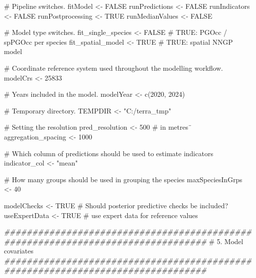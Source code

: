 \documentclass[
  letterpaper,
  DIV=11,
  numbers=noendperiod]{scrartcl}
\newenvironment{Shaded}{\begin{snugshade}}{\end{snugshade}}
\newcommand{\CommentTok}[1]{\textcolor[rgb]{0.37,0.37,0.37}{#1}}
\newcommand{\ConstantTok}[1]{\textcolor[rgb]{0.56,0.35,0.01}{#1}}
\newcommand{\DecValTok}[1]{\textcolor[rgb]{0.68,0.00,0.00}{#1}}
\newcommand{\DocumentationTok}[1]{\textcolor[rgb]{0.37,0.37,0.37}{\textit{#1}}}
\newcommand{\FunctionTok}[1]{\textcolor[rgb]{0.28,0.35,0.67}{#1}}
\newcommand{\NormalTok}[1]{\textcolor[rgb]{0.00,0.23,0.31}{#1}}
\newcommand{\OtherTok}[1]{\textcolor[rgb]{0.00,0.23,0.31}{#1}}
\newcommand{\StringTok}[1]{\textcolor[rgb]{0.13,0.47,0.30}{#1}}
\begin{document}
\begin{Shaded}
\begin{Highlighting}[]
\CommentTok{\# Pipeline switches.}
\NormalTok{fitModel }\OtherTok{\textless{}{-}} \ConstantTok{FALSE}
\NormalTok{runPredictions }\OtherTok{\textless{}{-}} \ConstantTok{FALSE}
\NormalTok{runIndicators }\OtherTok{\textless{}{-}} \ConstantTok{FALSE}
\NormalTok{runPostprocessing }\OtherTok{\textless{}{-}} \ConstantTok{TRUE}
\NormalTok{runMedianValues }\OtherTok{\textless{}{-}} \ConstantTok{FALSE}

\CommentTok{\# Model type switches.}
\NormalTok{fit\_single\_species }\OtherTok{\textless{}{-}} \ConstantTok{FALSE} \CommentTok{\# TRUE: PGOcc / spPGOcc per species}
\NormalTok{fit\_spatial\_model }\OtherTok{\textless{}{-}} \ConstantTok{TRUE} \CommentTok{\# TRUE: spatial NNGP model}


\CommentTok{\# Coordinate reference system used throughout the modelling workflow.}
\NormalTok{modelCrs }\OtherTok{\textless{}{-}} \DecValTok{25833}

\CommentTok{\# Years included in the model.}
\NormalTok{modelYear }\OtherTok{\textless{}{-}} \FunctionTok{c}\NormalTok{(}\DecValTok{2020}\NormalTok{, }\DecValTok{2024}\NormalTok{)}

\CommentTok{\# Temporary directory.}
\NormalTok{TEMPDIR }\OtherTok{\textless{}{-}} \StringTok{"C:/terra\_tmp"}


\CommentTok{\# Setting the resolution}
\NormalTok{pred\_resolution }\OtherTok{\textless{}{-}} \DecValTok{500} \CommentTok{\# in metres¨}
\NormalTok{aggregation\_spacing }\OtherTok{\textless{}{-}} \DecValTok{1000}

\CommentTok{\# Which column of predictions should be used to estimate indicators}
\NormalTok{indicator\_col }\OtherTok{\textless{}{-}} \StringTok{"mean"}

\CommentTok{\# How many groups should be used in grouping the species}
\NormalTok{maxSpeciesInGrps }\OtherTok{\textless{}{-}} \DecValTok{40}

\NormalTok{modelChecks }\OtherTok{\textless{}{-}} \ConstantTok{TRUE} \CommentTok{\# Should posterior predictive checks be included?}
\NormalTok{useExpertData }\OtherTok{\textless{}{-}} \ConstantTok{TRUE} \CommentTok{\# use expert data for reference values}

\DocumentationTok{\#\#\#\#\#\#\#\#\#\#\#\#\#\#\#\#\#\#\#\#\#\#\#\#\#\#\#\#\#\#\#\#\#\#\#\#\#\#\#\#\#\#\#\#\#\#\#\#\#\#\#\#\#\#\#\#\#\#\#\#\#\#\#\#\#\#\#\#\#\#\#\#\#\#\#\#\#\#\#\#}
\CommentTok{\# 5. Model covariates}
\DocumentationTok{\#\#\#\#\#\#\#\#\#\#\#\#\#\#\#\#\#\#\#\#\#\#\#\#\#\#\#\#\#\#\#\#\#\#\#\#\#\#\#\#\#\#\#\#\#\#\#\#\#\#\#\#\#\#\#\#\#\#\#\#\#\#\#\#\#\#\#\#\#\#\#\#\#\#\#\#\#\#\#\#}


\end{Highlighting}
\end{Shaded}
\end{document}
